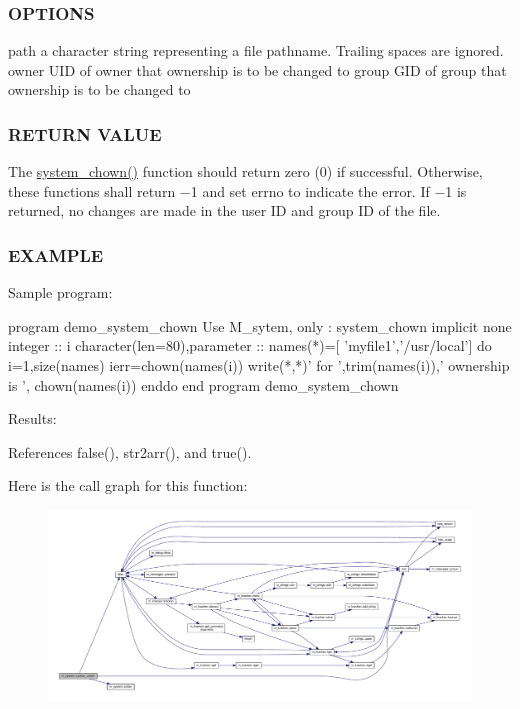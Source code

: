 \subsubsection*{O\+P\+T\+I\+O\+NS}

path a character string representing a file pathname. Trailing spaces are ignored. owner U\+ID of owner that ownership is to be changed to group G\+ID of group that ownership is to be changed to

\subsubsection*{R\+E\+T\+U\+RN V\+A\+L\+UE}

The \hyperlink{namespacem__system_a3353c1cff032fcfe2985a69f10038ddd}{system\+\_\+chown()} function should return zero (0) if successful. Otherwise, these functions shall return −1 and set errno to indicate the error. If −1 is returned, no changes are made in the user ID and group ID of the file.

\subsubsection*{E\+X\+A\+M\+P\+LE}

\begin{DoxyVerb}    Sample program:

       program demo_system_chown
       Use M_sytem, only : system_chown
       implicit none
       integer                     :: i
       character(len=80),parameter :: names(*)=[ 'myfile1','/usr/local']
       do i=1,size(names)
          ierr=chown(names(i))
          write(*,*)' for ',trim(names(i)),' ownership is ', chown(names(i))
       enddo
       end program demo_system_chown

    Results: \end{DoxyVerb}
 

References false(), str2arr(), and true().

Here is the call graph for this function\+:
\nopagebreak
\begin{figure}[H]
\begin{center}
\leavevmode
\includegraphics[width=350pt]{namespacem__system_a3353c1cff032fcfe2985a69f10038ddd_cgraph}
\end{center}
\end{figure}
\mbox{\label{namespacem__system_a9c34787b170ab8d41000d7c3acb60736}} 
